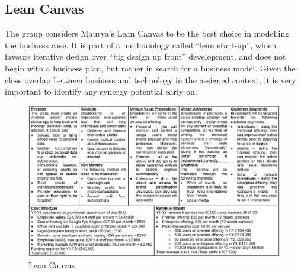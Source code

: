 \clearpage
\begin{landscape}

\subsection{Lean Canvas}

The group considers Maurya's Lean Canvas to be the best choice in modelling the business case. It is part of a methodology called "`lean start-up"', which favours iterative design over “big design up front” development, and does not begin with a business plan, but rather in search for a business model. Given the close overlap between business and technology in the assigned context, it is very important to identify any synergy potential early on.

\begin{figure}
  \centering
  \begin{minipage}{160mm}
    \centering
    \includegraphics[width=160mm]{inc/lean_canvas.png}
    \caption{Lean Canvas}
    \label{fig:lean_canvas}
  \end{minipage}
\end{figure}

\end{landscape}


